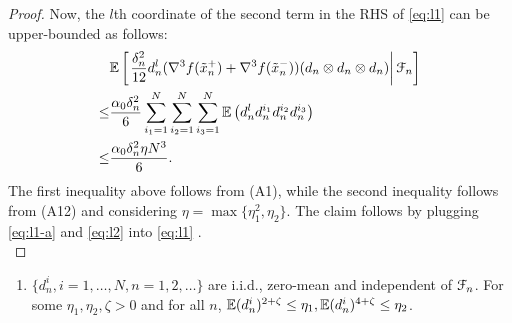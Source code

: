 \begin{proof}
Now, the $l$th coordinate of the second term in the RHS of \eqref{eq:l1} can be upper-bounded as follows:
\begin{align}
&\mathbb{E}\left[\left.\frac{\delta_n^2}{12} d_n^l (\nabla^3 f(\tilde  x_n^+)+\nabla^3 f(\tilde  x_n^-))(d_n \otimes d_n \otimes d_n)\right| \mathcal{F}_n\right]\nonumber\\
\le & \dfrac{\alpha_0 \delta_n^2}{6} \sum_{i_1=1}^N\sum_{i_2=1}^N\sum_{i_3=1}^N \mathbb{E}\left( d_n^l d_n^{i_1} d_n^{i_2} d_n^{i_3}\right)\nonumber\\
\le & \dfrac{\alpha_0 \delta_n^2\eta N^3}{6}.\label{eq:l2}
\end{align}
The first inequality above follows from (A1), while the second inequality follows from (A12) and considering $\eta = \max \{\eta_1^2, \eta_2\}$. The claim follows by plugging \eqref{eq:l1-a} and \eqref{eq:l2} into \eqref{eq:l1} .\\
\end{proof}

\begin{enumerate}[label=(\textbf{C\arabic*}),resume]
\item $\{d_n^i, i=1,\ldots,N, n=1,2,\ldots\}$ are i.i.d., zero-mean and independent of $\mathcal{F}_n$. For some $\eta_1,\eta_2,\zeta >0$ and for all $n$, $\mathbb{E}(d_n^i)^{2+\zeta} \le \eta_1,\mathbb{E}(d_n^i)^{4+\zeta} \le \eta_2$.
\end{enumerate}


